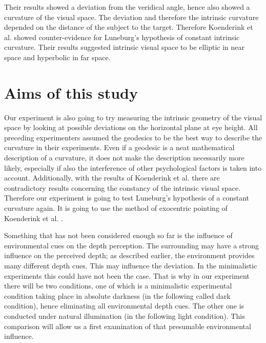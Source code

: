 Their results showed a deviation from the veridical angle, hence also showed a curvature of the visual space. The deviation and therefore the intrinsic curvature depended on the distance of the subject to the target. Therefore Koenderink et al. \citeyear{Koenderink.2000} showed counter-evidence for Luneburg's hypothesis of constant intrinsic curvature. Their results suggested intrinsic visual space to be elliptic in near space and hyperbolic in far space.

\section{Aims of this study}%
Our experiment is also going to try measuring the intrinsic geometry of the visual space by looking at possible deviations on the horizontal plane at eye height.
All preceding experimenters assumed the geodesics to be the best way to describe the curvature in their experiments. Even if a geodesic is a neat mathematical description of a curvature, it does not make the description necessarily more likely, especially if also the interference of other psychological factors is taken into account. Additionally, with the results of Koenderink et al. there are contradictory results concerning the constancy of the intrinsic visual space. Therefore our experiment is going to test Luneburg's hypothesis of a constant curvature again. It is going to use the method of exocentric pointing of Koenderink et al. \citeyear{Koenderink.2000}. 

Something that has not been considered enough so far is the influence of environmental cues on the depth perception. The surrounding may have a strong influence on the perceived depth; as described earlier, the environment provides many different depth cues. This may influence the deviation. In the minimalistic experiments this could have not been the case. That is why in our experiment there will be two conditions, one of which is a minimalistic experimental condition taking place in absolute darkness (in the following called dark condition), hence eliminating all environmental depth cues. The other one is conducted under natural illumination (in the following light condition). This comparison will allow us a first examination of that presumable environmental influence. 


